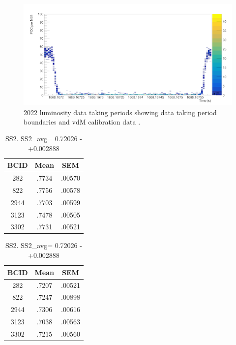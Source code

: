 \begin{figure}[!htp]
\centering
\includegraphics[width=1\textwidth]{ashish_thesis/2022_SS_scan.png}
\caption[2018 CMS luminosity data taking periods.]{%
  2022 luminosity data taking periods showing data taking period boundaries and vdM calibration data  \cite{CERNLumiPublicResults}.
}
\label{fig:period_bound}
\end{figure}


\begin{table}[h]
    \centering
    \begin{minipage}{0.45\textwidth}
        \centering
        \caption{SS1   SS1_avg= 0.76804 +- 0.002478}
        \begin{tabular}{ccc}
        \textbf{BCID} & \textbf{Mean} & \textbf{SEM} \\ 
        \hline
        282 & .7734 & .00570 \\ 
        822 & .7756 & .00578 \\ 
        2944 & .7703 & .00599 \\ 
        3123 & .7478 & .00505 \\ 
        3302 & .7731 & .00521 \\ 
        \end{tabular}
    \end{minipage}
    \hfill
    \begin{minipage}{0.45\textwidth}
        \centering
        \caption{SS2.  SS2_avg= 0.72026 -+0.002888}
        \begin{tabular}{ccc}
        \textbf{BCID} & \textbf{Mean} & \textbf{SEM} \\ 
        \hline
        282 & .7207 & .00521 \\ 
        822 & .7247 & .00898 \\ 
        2944 & .7306 & .00616 \\ 
        3123 & .7038 & .00563 \\ 
        3302 & .7215 & .00560 \\ 
        \end{tabular}
    \end{minipage}
\end{table}



